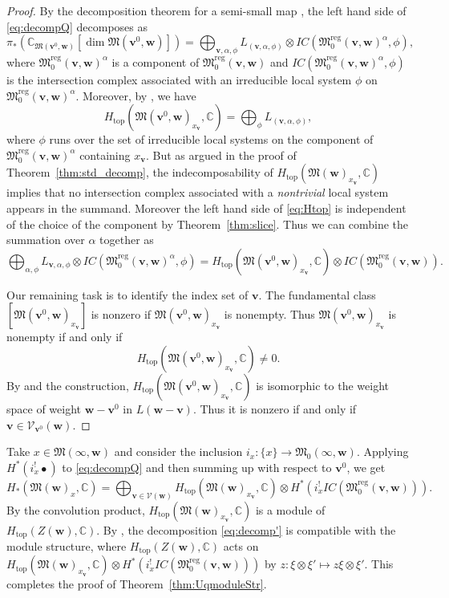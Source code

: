 \documentclass[12pt]{amsart}
\def\Bbb{\mathbb}
\def\frak{\mathfrak}
\theoremstyle{definition}
\theoremstyle{remark}
\numberwithin{equation}{subsection}
\newcommand{\thmref}[1]{Theorem~\ref{#1}}
\newcommand{\C}{{\Bbb C}}
\newcommand{\M}{{\frak M}} %
\newcommand{\Mreg}{{\frak M_0^{\operatorname{reg}}}}
\newcommand{\bv}{{\mathbf v}} %
\newcommand{\bw}{{\mathbf w}} %
\newcommand{\topdeg}{\operatorname{top}} %
\newcommand{\Zw}{Z(\bw)}
\newcommand{\Mw}{\M(\bw)}
\begin{document}
\begin{proof}
By the decomposition theorem for a semi-small map
\cite[8.9.3]{Gi-book}, the left hand side of \eqref{eq:decompQ}
decomposes as
\begin{equation*}
   \pi_*\left(\C_{\M(\bv^0,\bw)}[\dim\M(\bv^0,\bw)]\right)
  = \bigoplus_{\bv,\alpha,\phi}
  L_{(\bv,\alpha,\phi)} \otimes IC(\Mreg(\bv,\bw)^{\alpha},\phi),
\end{equation*}
where $\Mreg(\bv,\bw)^{\alpha}$ is a component of
$\Mreg(\bv,\bw)$ and $IC(\Mreg(\bv,\bw)^{\alpha},\phi)$ is the
intersection complex associated with an irreducible local system
$\phi$ on $\Mreg(\bv,\bw)^{\alpha}$.
%
Moreover, by \cite[8.9.9]{Gi-book}, we have
\begin{equation}\label{eq:Htop}
   H_{\topdeg}(\M(\bv^0,\bw)_{x_{\bv}},\C) = \bigoplus_\phi
     L_{(\bv,\alpha,\phi)},
\end{equation}
where $\phi$ runs over the set of irreducible local systems on the
component of $\Mreg(\bv,\bw)^{\alpha}$ containing $x_{\bv}$.
%
But as argued in the proof of \thmref{thm:std_decomp},
the indecomposability of $H_{\topdeg}(\Mw_{x_{\bv}},\C)$
implies that no intersection complex associated with a {\it
nontrivial\/} local system appears in the summand.
%
Moreover the left hand side of \eqref{eq:Htop} is independent of the
choice of the component by \thmref{thm:slice}.
%
Thus we can combine the summation over $\alpha$ together as
\[
   \bigoplus_{\alpha,\phi} L_{\bv,\alpha,\phi} \otimes
       IC(\Mreg(\bv,\bw)^{\alpha},\phi)
   = H_{\topdeg}(\M(\bv^0,\bw)_{x_{\bv}},\C)\otimes IC(\Mreg(\bv,\bw)).
\]

Our remaining task is to identify the index set of $\bv$.
%
The fundamental class $[\M(\bv^0,\bw)_{x_{\bv}}]$ is nonzero 
if $\M(\bv^0,\bw)_{x_{\bv}}$ is nonempty. Thus
$\M(\bv^0,\bw)_{x_{\bv}}$ is nonempty if and only if
\[
    H_{\topdeg}(\M(\bv^0,\bw)_{x_{\bv}},\C)\neq 0.
\]
By \cite[10.2]{Na-alg} and the construction,
$H_{\topdeg}(\M(\bv^0,\bw)_{x_{\bv}},\C)$ is isomorphic to the weight
space of weight $\bw - \bv^0$ in $L(\bw-\bv)$. Thus it is nonzero if
and only if $\bv\in \mathcal V_{\bv^0}(\bw)$.
\end{proof}

Take $x\in \M(\infty,\bw)$ and consider the inclusion
$i_x\colon \{x\} \to \M_0(\infty,\bw)$.
%
Applying $H^*(i_x^!\bullet)$ to \eqref{eq:decompQ} and then
summing up with respect to $\bv^0$, we get
\begin{equation}\label{eq:decomp'}
   H_*(\Mw_x,\C)
   = \bigoplus_{\bv\in\mathcal V(\bw)}
        H_{\topdeg}(\Mw_{x_{\bv}},\C)\otimes
        H^*(i_x^!IC(\Mreg(\bv,\bw))).
\end{equation}
%
By the convolution product, $H_{\topdeg}(\Mw_{x_{\bv}},\C)$ is a
module of $H_{\topdeg}(\Zw,\C)$.
%
By \cite[\S8.9]{Gi-book}, the decomposition \eqref{eq:decomp'} is
compatible with the module structure, where
$H_{\topdeg}(\Zw,\C)$ acts on
$H_{\topdeg}(\Mw_{x_{\bv}},\C)\otimes H^*(i_x^!IC(\Mreg(\bv,\bw)))$ by
$z\colon \xi\otimes\xi' \mapsto z\xi\otimes\xi'$.
%
This completes the proof of \thmref{thm:UqmoduleStr}.
\end{document}
